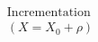 \documentclass[preview]{standalone}
\begin{document}
\begin{align*}
\text{Incrementation}\\ (X = X_0 + \rho)
\end{align*}
\end{document}
